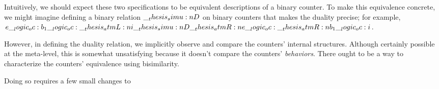 Intuitively, we should expect these two specifications to be equivalent descriptions of a binary counter.
To make this equivalence concrete, we might imagine defining a binary relation $\__thesis_simu:n {D}$ on binary counters that makes the duality precise;
for example, $e \__logic_oc: b_1 \__logic_oc: \__thesis_atmL:n {i} \__thesis_simu:n {D} \__thesis_atmR:n {e} \__logic_oc: \__thesis_atmR:n {b}_1 \__logic_oc: i$.

However, in defining the duality relation, we implicitly observe and compare the counters' internal structures.
Although certainly possible at the meta-level, this is somewhat unsatisfying because it doesn't compare the counters' \emph{behaviors}.
There ought to be a way to characterize the counters' equivalence using bisimilarity.

Doing so requires a few small changes to 







